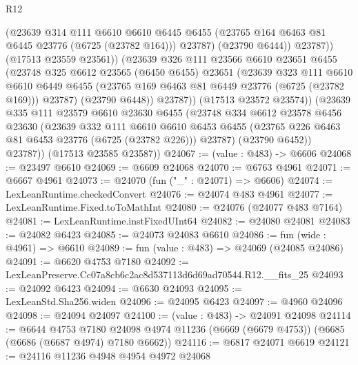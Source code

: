 \begin{lexlean}{R12}
\begin{coremodule}
                    (@23639
                      @314
                      @111
                      @6610
                      @6610
                      @6445
                      @6455
                      (@23765 @164 @6463 @81 @6445 @23776 (@6725 (@23782 @164)))
                      @23787)
                    (@23790 @6444))
                  @23787))
              (@17513 @23559 @23561))
            (@23639
              @326
              @111
              @23566
              @6610
              @23651
              @6455
              (@23748
                @325
                @6612
                @23565
                (@6450 @6455)
                @23651
                (@23639
                  @323
                  @111
                  @6610
                  @6610
                  @6449
                  @6455
                  (@23765 @169 @6463 @81 @6449 @23776 (@6725 (@23782 @169)))
                  @23787)
                (@23790 @6448))
              @23787))
          (@17513 @23572 @23574))
        (@23639
          @335
          @111
          @23579
          @6610
          @23630
          @6455
          (@23748
            @334
            @6612
            @23578
            @6456
            @23630
            (@23639
              @332
              @111
              @6610
              @6610
              @6453
              @6455
              (@23765 @226 @6463 @81 @6453 @23776 (@6725 (@23782 @226)))
              @23787)
            (@23790 @6452))
          @23787))
      (@17513 @23585 @23587))
@24067 := (value : @483) -> @6606
@24068 := @23497 @6610
@24069 := @6609 @24068
@24070 := @6763 @4961
@24071 := @6667 @4961
@24073 := @24070 (fun ("_" : @24071) => @6606)
@24074 := LexLeanRuntime.checkedConvert
@24076 := @24074 @483 @4961
@24077 := LexLeanRuntime.Fixed.toToMathInt
@24080 := @24076 (@24077 @483 @7164)
@24081 := LexLeanRuntime.instFixedUInt64
@24082 := @24080 @24081
@24083 := @24082 @6423
@24085 := @24073 @24083 @6610
@24086 := fun (wide : @4961) => @6610
@24089 := fun (value : @483) => @24069 (@24085 @24086)
@24091 := @6620 @4753 @7180
@24092 := LexLeanPreserve.Cc07a8cb6c2ac8d537113d6d69ad70544.R12.__fits_25
@24093 := @24092 @6423
@24094 := @6630 @24093
@24095 := LexLeanStd.Sha256.widen
@24096 := @24095 @6423
@24097 := @4960 @24096
@24098 := @24094 @24097
@24100 := (value : @483) -> @24091 @24098
@24114 := @6644
    @4753
    @7180
    @24098
    @4974
    @11236
    (@6669 (@6679 @4753))
    (@6685 (@6686 (@6687 @4974) @7180 @6662))
@24116 := @6817 @24071 @6619
@24121 := @24116 @11236 @4948 @4954 @4972 @24068

\end{coremodule}
\end{lexlean}
